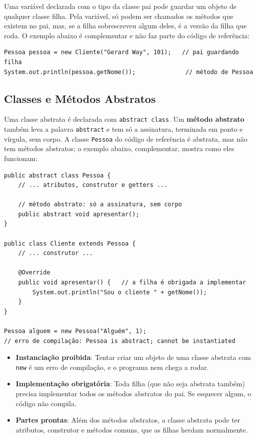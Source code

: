 Uma variável declarada com o tipo da classe pai pode guardar um objeto de qualquer classe
filha. Pela variável, só podem ser chamados os métodos que existem no pai, mas, se a filha
sobrescreveu algum deles, é a versão da filha que roda. O exemplo abaixo é complementar e não
faz parte do código de referência:

\begin{lstlisting}[style=java]
Pessoa pessoa = new Cliente("Gerard Way", 101);   // pai guardando filha
System.out.println(pessoa.getNome());              // método de Pessoa
\end{lstlisting}

\subsection{Classes e Métodos Abstratos}

Uma classe abstrata é declarada com \texttt{abstract class}. Um \textbf{método abstrato} também
leva a palavra \texttt{abstract} e tem só a assinatura, terminada em ponto e vírgula, sem corpo.
A classe \texttt{Pessoa} do código de referência é abstrata, mas não tem métodos abstratos; o
exemplo abaixo, complementar, mostra como eles funcionam:

\begin{lstlisting}[style=java]
public abstract class Pessoa {
    // ... atributos, construtor e getters ...

    // método abstrato: só a assinatura, sem corpo
    public abstract void apresentar();
}

public class Cliente extends Pessoa {
    // ... construtor ...

    @Override
    public void apresentar() {   // a filha é obrigada a implementar
        System.out.println("Sou o cliente " + getNome());
    }
}

Pessoa alguem = new Pessoa("Alguém", 1);
// erro de compilação: Pessoa is abstract; cannot be instantiated
\end{lstlisting}

\begin{itemize}
    \item \textbf{Instanciação proibida}: Tentar criar um objeto de uma classe abstrata com
    \texttt{new} é um erro de compilação, e o programa nem chega a rodar.

    \item \textbf{Implementação obrigatória}: Toda filha (que não seja abstrata também) precisa
    implementar todos os métodos abstratos do pai. Se esquecer algum, o código não compila.

    \item \textbf{Partes prontas}: Além dos métodos abstratos, a classe abstrata pode ter
    atributos, construtor e métodos comuns, que as filhas herdam normalmente.
\end{itemize}

